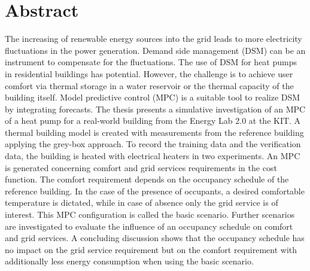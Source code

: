 
\chapter{Abstract}

The increasing of renewable energy sources into the grid leads to more electricity fluctuations in the power generation. Demand side management (DSM) can be an instrument to compensate for the fluctuations. The use of DSM for heat pumps in residential buildings has potential. However, the challenge is to achieve user comfort via thermal storage in a water reservoir or the thermal capacity of the building itself. Model predictive control (MPC) is a suitable tool to realize DSM by integrating forecasts.\newline
The thesis presents a simulative investigation of an MPC of a heat pump for a real-world building from the Energy Lab 2.0 at the KIT. A thermal building model is created with measurements from the reference building applying the grey-box approach. To record the training data and the verification data, the building is heated with electrical heaters in two experiments.\newline
An MPC is generated concerning comfort and grid services requirements in the cost function. The comfort requirement depends on the occupancy schedule of the reference building. In the case of the presence of occupants, a desired comfortable temperature is dictated, while in case of absence only the grid service is of interest. This MPC configuration is called the basic scenario. Further scenarios are investigated to evaluate the influence of an occupancy schedule on comfort and grid services. A concluding discussion shows that the occupancy schedule has no impact on the grid service requirement but on the comfort requirement with additionally less energy consumption when using the basic scenario.